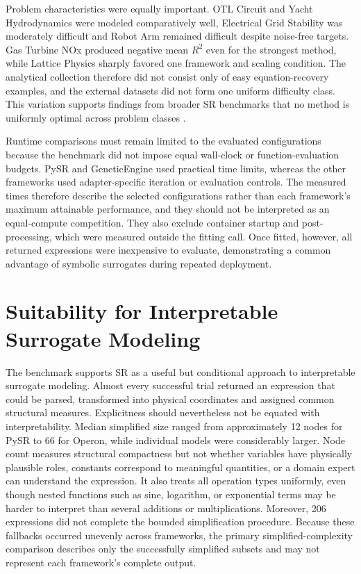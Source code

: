 \documentclass[12pt,oneside,bibtotoc,liststotoc]{scrbook}
\begin{document}
Problem characteristics were equally important. OTL Circuit and Yacht Hydrodynamics were modeled comparatively well, Electrical Grid Stability was moderately difficult and Robot Arm remained difficult despite noise-free targets. Gas Turbine NOx produced negative mean $R^2$ even for the strongest method, while Lattice Physics sharply favored one framework and scaling condition. The analytical collection therefore did not consist only of easy equation-recovery examples, and the external datasets did not form one uniform difficulty class. This variation supports findings from broader SR benchmarks that no method is uniformly optimal across problem classes \cite{lacava2021contemporary,dong2025recent}.

Runtime comparisons must remain limited to the evaluated configurations because the benchmark did not impose equal wall-clock or function-evaluation budgets. PySR and GeneticEngine used practical time limits, whereas the other frameworks used adapter-specific iteration or evaluation controls. The measured times therefore describe the selected configurations rather than each framework's maximum attainable performance, and they should not be interpreted as an equal-compute competition. They also exclude container startup and post-processing, which were measured outside the fitting call. Once fitted, however, all returned expressions were inexpensive to evaluate, demonstrating a common advantage of symbolic surrogates during repeated deployment.

\section{Suitability for Interpretable Surrogate Modeling}

The benchmark supports SR as a useful but conditional approach to interpretable surrogate modeling. Almost every successful trial returned an expression that could be parsed, transformed into physical coordinates and assigned common structural measures. Explicitness should nevertheless not be equated with interpretability. Median simplified size ranged from approximately 12 nodes for PySR to 66 for Operon, while individual models were considerably larger. Node count measures structural compactness but not whether variables have physically plausible roles, constants correspond to meaningful quantities, or a domain expert can understand the expression. It also treats all operation types uniformly, even though nested functions such as sine, logarithm, or exponential terms may be harder to interpret than several additions or multiplications. Moreover, 206 expressions did not complete the bounded simplification procedure. Because these fallbacks occurred unevenly across frameworks, the primary simplified-complexity comparison describes only the successfully simplified subsets and may not represent each framework's complete output.
\end{document}

